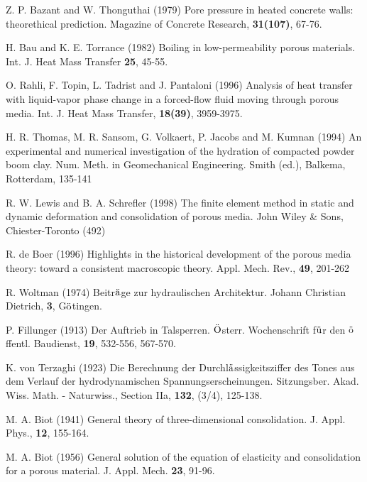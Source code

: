 \begin{thebibliography}{99}


Z. P. Bazant and W. Thonguthai (1979) Pore pressure in heated concrete walls: theorethical prediction.
Magazine of Concrete Research, {\bf 31(107)}, 67-76.

H. Bau and K. E. Torrance (1982) Boiling in low-permeability porous materials. Int. J. Heat Mass Transfer {\bf 25}, 45-55.

O. Rahli, F. Topin, L. Tadrist and J. Pantaloni (1996) Analysis of heat transfer 
with liquid-vapor phase change in a forced-flow fluid moving through porous media.
Int. J. Heat Mass Transfer, {\bf 18(39)}, 3959-3975.

H. R. Thomas, M. R. Sansom, G. Volkaert, P. Jacobs and M. Kumnan (1994)
An experimental and numerical investigation of the hydration of compacted powder boom clay.
Num. Meth. in Geomechanical Engineering. Smith (ed.), Balkema, Rotterdam, 135-141

R. W. Lewis and B. A. Schrefler (1998) The finite element method in static and dynamic deformation and consolidation 
of porous media. John Wiley \& Sons, Chiester-Toronto (492)

R. de Boer (1996)
Highlights in the historical development of the porous media theory: toward a consistent macroscopic theory. 
Appl. Mech. Rev., {\bf 49}, 201-262

R. Woltman (1974) Beitr${\rm \ddot{a}}$ge zur hydraulischen Architektur.
Johann Christian Dietrich, {\bf 3}, G${\rm\ddot{o}}$tingen.

P. Fillunger (1913) Der Auftrieb in Talsperren. 
${\rm\ddot{O}}$sterr. Wochenschrift f${\rm\ddot{u}}$r den ${\rm\ddot{o}}$ffentl. Baudienst, {\bf 19}, 532-556, 567-570.

K. von Terzaghi (1923)
Die Berechnung der Durchl${\rm\ddot{a}}$ssigkeitsziffer des Tones aus dem Verlauf der hydrodynamischen 
Spannungserscheinungen. Sitzungsber. Akad. Wiss. Math. - Naturwiss., Section IIa, {\bf 132}, (3/4), 125-138.

M. A. Biot (1941) General theory of three-dimensional consolidation. J. Appl. Phys., {\bf 12}, 155-164.

M. A. Biot (1956) General solution of the equation of elasticity and consolidation for a porous material.
J. Appl. Mech. {\bf 23}, 91-96.


\end{thebibliography}
